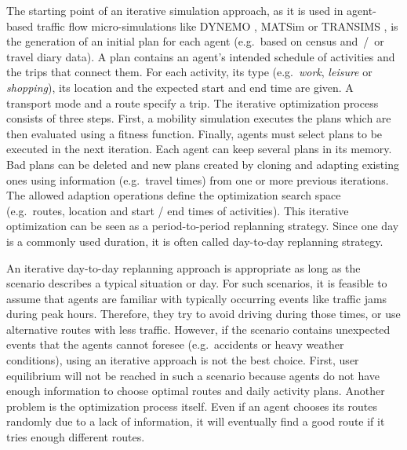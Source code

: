The starting point of an iterative simulation approach, as it is used in agent-based traffic flow micro-simulations like DYNEMO \citep{Schwerdtfeger_VolmulerHamerslag_1984, NoekelSchmidt_NSE_2002}, MATSim \citep{Balmer_PhDThesis_2007, BalmerEtAl_HEUREKA_2008} or TRANSIMS \citep{SmithEtAl_NTRPAC_1995, NagelRickert_ParComp_2001},  is the generation of an initial plan for each agent (e.g.\ based on census and~/~or travel diary data). A plan contains an agent's intended schedule of activities and the trips that connect them. For each activity, its type (e.g.\ \emph{work}, \emph{leisure} or \emph{shopping}), its location and the expected start and end time are given. A transport mode and a route specify a trip. The iterative optimization process consists of three steps. First, a mobility simulation executes the plans which are then evaluated using a fitness function. Finally, agents must select plans to be executed in the next iteration. Each agent can keep several plans in its memory. Bad plans can be deleted and new plans created by cloning and adapting existing ones using information (e.g.\ travel times) from one or more previous iterations. The allowed adaption operations define the optimization search space (e.g.\ routes, location and start / end times of activities). This iterative optimization can be seen as a period-to-period replanning strategy. Since one day is a commonly used duration, it is often called day-to-day replanning strategy.

An iterative day-to-day replanning approach is appropriate as long as the scenario describes a typical situation or day. For such scenarios, it is feasible to assume that agents are familiar with typically occurring events like traffic jams during peak hours. Therefore, they try to avoid driving during those times, or use alternative routes with less traffic. However, if the scenario contains unexpected events that the agents cannot foresee (e.g.\ accidents or heavy weather conditions), using an iterative approach is not the best choice. First, user equilibrium will not be reached in such a scenario because agents do not have enough information to choose optimal routes and daily activity plans. Another problem is the optimization process itself. Even if an agent chooses its routes randomly due to a lack of information, it will eventually find a good route if it tries enough different routes.


